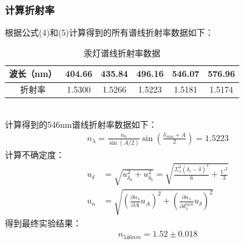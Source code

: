 \documentclass[UTF8]{ctexart}
\begin{document}
\subsubsection{计算折射率}
根据公式(4)和(5)计算得到的所有谱线折射率数据如下：\\
\begin{table}[h]
    \begin{center}
        \begin{tabular}{|c|c|c|c|c|c|}
            \hline
            波长（nm）& 404.66 & 435.84 & 496.16 & 546.07 & 576.96 \\
            \hline
            折射率 & 1.5300 & 1.5266 & 1.5223 & 1.5181 & 1.5174 \\
            \hline
        \end{tabular}
        \caption{汞灯谱线折射率数据}
    \end{center}
\end{table}
\\
计算得到的546nm谱线折射率数据如下：\\
\begin{align}
    n_\lambda=\frac{n_0}{\sin(A/2)}\sin(\frac{\delta_{min}+A}{2})=1.5223
\end{align}
计算不确定度：
\begin{align}
    u_\delta&=\sqrt{u_{\delta_a}^2+u_{\delta_b}^2}=\sqrt{\frac{\Sigma_1^3(\delta_i-\bar{\delta})^2}{6}+\frac{1'^2}{3}} \\
    u_{n}&=\sqrt{(\frac{\partial n_{\lambda}}{\partial A} u_A)^2+(\frac{\partial n_{\lambda}}{\partial \delta_{\lambda}^{min}}u_{\delta})^2}
\end{align}
得到最终实验结果：
\begin{align}
    n_{546nm}=1.52\pm 0.018
\end{align}
\\
\end{document}
